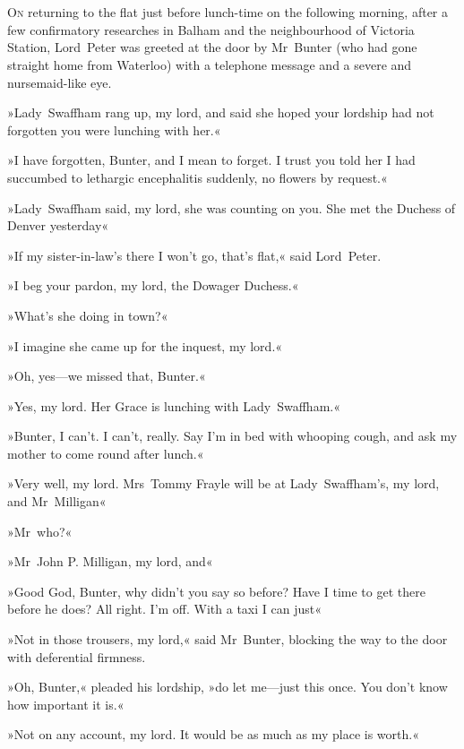 \chapter[Chapter \thechapter]{}
\lettrine[lines=4]{O}{n} returning to the flat just before lunch-time on the following morning, after a few confirmatory researches in Balham and the neighbourhood of Victoria Station, Lord~Peter was greeted at the door by Mr~Bunter (who had gone straight home from Waterloo) with a telephone message and a severe and nursemaid-like eye.

»Lady~Swaffham rang up, my lord, and said she hoped your lordship had not forgotten you were lunching with her.«

»I have forgotten, Bunter, and I mean to forget. I trust you told her I had succumbed to lethargic encephalitis suddenly, no flowers by request.«

»Lady~Swaffham said, my lord, she was counting on you. She met the Duchess of Denver yesterday\longdash«

»If my sister-in-law's there I won't go, that's flat,« said Lord~Peter.

»I beg your pardon, my lord, the Dowager Duchess.«

»What's she doing in town?«

»I imagine she came up for the inquest, my lord.«

»Oh, yes—we missed that, Bunter.«

»Yes, my lord. Her Grace is lunching with Lady~Swaffham.«

»Bunter, I can't. I can't, really. Say I'm in bed with whooping cough, and ask my mother to come round after lunch.«

»Very well, my lord. Mrs~Tommy Frayle will be at Lady~Swaffham's, my lord, and Mr~Milligan\longdash«

»Mr~who?«

»Mr~John P. Milligan, my lord, and\longdash«

»Good God, Bunter, why didn't you say so before? Have I time to get there before he does? All right. I'm off. With a taxi I can just\longdash«

»Not in those trousers, my lord,« said Mr~Bunter, blocking the way to the door with deferential firmness.

»Oh, Bunter,« pleaded his lordship, »do let me—just this once. You don't know how important it is.«

»Not on any account, my lord. It would be as much as my place is worth.«

